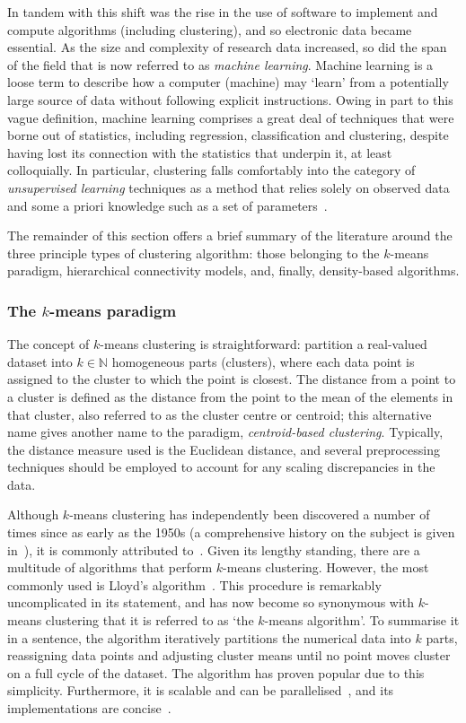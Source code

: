 In tandem with this shift was the rise in the use of software to implement and
compute algorithms (including clustering), and so electronic data became
essential. As the size and complexity of research data increased, so did the
span of the field that is now referred to as \emph{machine learning}. Machine
learning is a loose term to describe how a computer (machine) may `learn' from a
potentially large source of data without following explicit instructions. Owing
in part to this vague definition, machine learning comprises a great deal of
techniques that were borne out of statistics, including regression,
classification and clustering, despite having lost its connection with the
statistics that underpin it, at least colloquially. In particular, clustering
falls comfortably into the category of \emph{unsupervised learning} techniques
as a method that relies solely on observed data and some a priori
knowledge such as a set of parameters~\cite{Dayan1999}.

The remainder of this section offers a brief summary of the literature around
the three principle types of clustering algorithm: those belonging to the
\(k\)-means paradigm, hierarchical connectivity models, and, finally,
density-based algorithms.

\subsubsection{The \(k\)-means paradigm}\label{subsubsec:kmeans}

The concept of \(k\)-means clustering is straightforward: partition a
real-valued dataset into \(k \in \mathbb N\) homogeneous parts (clusters), where
each data point is assigned to the cluster to which the point is closest. The
distance from a point to a cluster is defined as the distance from the point to
the mean of the elements in that cluster, also referred to as the cluster centre
or centroid; this alternative name gives another name to the paradigm,
\emph{centroid-based clustering}. Typically, the distance measure used is the
Euclidean distance, and several preprocessing techniques should be employed to
account for any scaling discrepancies in the data.

Although \(k\)-means clustering has independently been discovered a number of
times since as early as the 1950s (a comprehensive history on the subject is
given in~\cite{Jain2010}), it is commonly attributed to~\cite{Hartigan1979}.
Given its lengthy standing, there are a multitude of algorithms that perform
\(k\)-means clustering. However, the most commonly used is Lloyd's
algorithm~\cite{Lloyd1982}. This procedure is remarkably uncomplicated in its
statement, and has now become so synonymous with \(k\)-means clustering that it
is referred to as `the \(k\)-means algorithm'. To summarise it in a sentence,
the algorithm iteratively partitions the numerical data into \(k\) parts,
reassigning data points and adjusting cluster means until no point moves cluster
on a full cycle of the dataset. The algorithm has proven popular due to this
simplicity. Furthermore, it is scalable and can be
parallelised~\cite{Bahmani2012}, and its implementations are
concise~\cite{Olafsson2008,Wu2009}.

